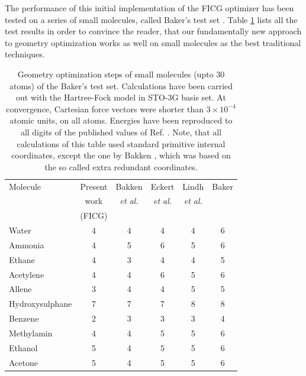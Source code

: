 \documentclass[prl,aps,twocolumn,showpacs,twocolumngrid,superbib]{revtex4}
\begin{document}
The performance of this initial implementation of the FICG optimizer
has been tested on a 
series of small molecules, called Baker's test set \cite{bakerstest}.
Table \ref{Bakers_test} lists all the test results
in order to convince
the reader, that our fundamentally new approach to geometry optimization
works as well on small molecules as the best traditional techniques.
\begin{table}[h]
\squeezetable
\caption{
Geometry optimization steps of small molecules (upto 30 atoms)
of the Baker's test set. Calculations have been carried out 
with the Hartree-Fock model in STO-3G basis set.
At convergence, Cartesian force vectors were shorter 
than $3\times10^{-4}$ atomic units, on all atoms. Energies have been
reproduced to all digits of the published values 
of Ref. \cite{bakerstest}.
Note, that all calculations of this table used standard primitive 
internal coordinates, except the one by Bakken \cite{bakken}, 
which was based on the so called extra redundant coordinates.
}
\label{Bakers_test}
\begin{tabular}{lccccc}
\toprule
Molecule               & Present  & Bakken & Eckert  & Lindh &  Baker  \\
         & work & {\it{et al.}} & {\it{et al.}} & {\it{et al.}} &    \\
         &(FICG) &  \cite{bakken} &  \cite{eckert} & \cite{lindh} &  \cite{bakerstest} \\
\colrule
Water                  &   4    &   4    &    4    &    4   &   6     \\
Ammonia                &   4    &   5    &    6    &    5   &   6     \\
Ethane                 &   4    &   3    &    4    &    4   &   5     \\
Acetylene              &   4    &   4    &    6    &    5   &   6     \\
Allene                 &   3    &   4    &    4    &    5   &   5     \\
Hydroxysulphane        &   7    &   7    &    7    &    8   &   8     \\
Benzene                &   2    &   3    &    3    &    3   &   4     \\
Methylamin             &   4    &   4    &    5    &    5   &   6     \\
Ethanol                &   5    &   4    &    5    &    5   &   6     \\
Acetone                &   5    &   4    &    5    &    5   &   6     \\

\end{tabular}
\end{table}
\end{document}
